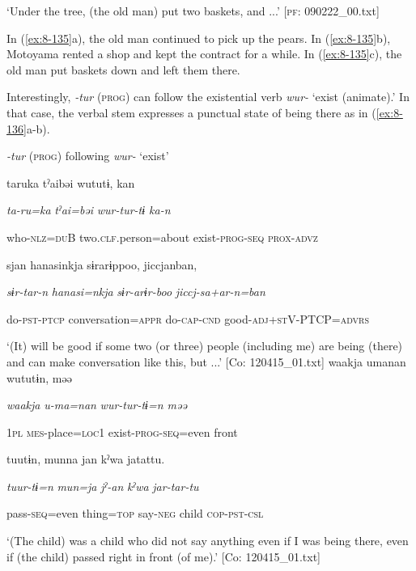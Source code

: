 \glt ‘Under the tree, (the old man) put two baskets, and ...’ [\textsc{pf}: 090222\_00.txt]
\z

In (\ref{ex:8-135}a), the old man continued to pick up the pears. In (\ref{ex:8-135}b), Motoyama rented a shop and kept the contract for a while. In (\ref{ex:8-135}c), the old man put baskets down and left them there.

  Interestingly, \textit{{}-tur} (\textsc{prog}) can follow the existential verb \textit{wur-} ‘exist (animate).’ In that case, the verbal stem expresses a punctual state of being there as in (\ref{ex:8-136}a-b).

\ea\label{ex:8-136}
  \textit{{}-tur} (\textsc{prog}) following \textit{wur-} ‘exist’


    {\TM}
\glll  taruka  tˀaibəi  wututɨ,  kan

      \textit{ta-ru=ka}  \textit{tˀai=bəi}  \textit{wur-tur{}-tɨ  ka-n}

      who-\textsc{nlz}=\textsc{du}B  two.\textsc{clf}.person=about  exist-\textsc{prog}-\textsc{seq}  \textsc{prox}-\textsc{advz}

      sjan  hanasinkja  sɨrarɨppoo,  jiccjanban,

      \textit{sɨr-tar-n}  \textit{hanasi=nkja}  \textit{sɨr-arɨr-boo}  \textit{jiccj-sa+ar-n=ban}

      do-\textsc{pst}-\textsc{ptcp}  conversation=\textsc{appr}  do-\textsc{cap}-\textsc{cnd}  good-\textsc{adj}+\textsc{st}V-PTCP=\textsc{advrs}

\glt ‘(It) will be good if some two (or three) people (including me) are being (there) and can make conversation like this, but ...’ [Co: 120415\_01.txt]
\ex {\TM}
\glll  waakja  umanan  wututɨn,  məə

      \textit{waakja}  \textit{u-ma=nan}  \textit{wur-tur{}-tɨ=n  məə}

      1\textsc{pl}  \textsc{mes}-place=\textsc{loc}1  exist-\textsc{prog}-\textsc{seq}=even  front

      tuutɨn,  munna  jan  kˀwa  jatattu.

      \textit{tuur-tɨ=n}  \textit{mun=ja}  \textit{jˀ-an}  \textit{kˀwa}  \textit{jar-tar-tu}

      pass-\textsc{seq}=even  thing=\textsc{top}  say-\textsc{neg}  child  \textsc{cop}-\textsc{pst}-\textsc{csl}

\glt ‘(The child) was a child who did not say anything even if I was being there, even if (the child) passed right in front (of me).’ [Co: 120415\_01.txt]
\z

